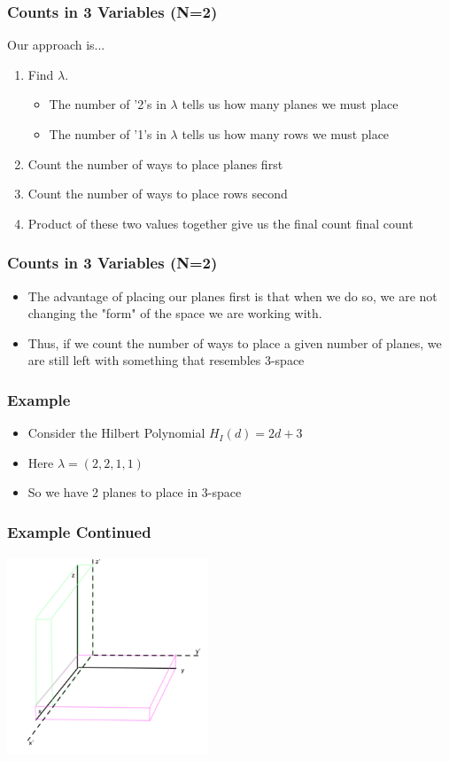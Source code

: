 \documentclass{beamer}
\begin{document}
\begin{frame}
	\frametitle{Counts in 3 Variables (N=2)}
	Our approach is...
	\begin{enumerate}
	\item Find $\lambda$. 
	\begin{itemize}
		\item The number of '2's in $\lambda$ tells us how many planes we must place
		\item The number of '1's in $\lambda$ tells us how many rows we must place
	\end{itemize}
	\item Count the number of ways to place planes first
	\item Count the number of ways to place rows second
	\item Product of these two values together give us the final count final count
	\end{enumerate}
\end{frame}

\begin{frame}
	\frametitle{Counts in 3 Variables (N=2)}
	\begin{itemize}
	\item The advantage of placing our planes first is that when we do so, we are not changing the "form" of the space we are working with.
	\item Thus, if we count the number of ways to place a given number of planes, we are still left with something that resembles 3-space
	\end{itemize}
\end{frame}

\begin{frame}
	\frametitle{Example}
	\begin{itemize}
	\item Consider the Hilbert Polynomial $H_I(d) = 2d+3$
	\item Here $\lambda = (2,2,1,1)$
	\item So we have 2 planes to place in 3-space
	\end{itemize}
\end{frame}


\begin{frame}
	\frametitle{Example Continued}
	\begin{center}
	\includegraphics[width = 6cm, height = 6cm]{LogMMidtermPresentationImages/shifting3spacegood.png}
	\end{center}
\end{frame}
\end{document}
